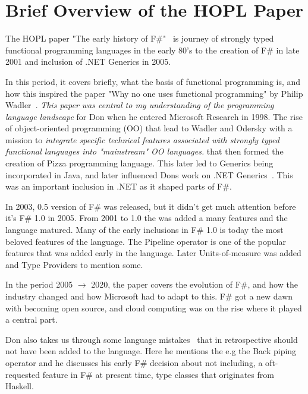 \documentclass[12pt]{article}
\begin{document}
\newpage

\section{Brief Overview of the HOPL Paper}

The HOPL paper "The early history of F\#"~\cite{syme_early_2020} is journey of strongly typed functional programming languages in the early 80's to the creation of F\# in late 2001 and inclusion of .NET Generics in 2005. 

In this period, it covers briefly, what the basis of functional programming is, and how this inspired the paper "Why no one uses functional programming" by Philip Wadler~\cite{wadler_why_1998}. \textit{This paper was central to my understanding of the programming language landscape}\parencite[p 9]{syme_early_2020} for Don when he entered Microsoft Research in 1998. The rise of object-oriented programming (OO) that lead to Wadler and Odersky with a mission to \textit{integrate specific technical features associated with strongly typed functional languages into "mainstream" OO languages.}\parencite[p9]{syme_early_2020} that then formed the creation of Pizza programming language. This later led to Generics being incorporated in Java, and later influenced Dons work on .NET Generics~\cite{syme_ilx_2001}. This was an important inclusion in .NET as it shaped parts of F\#. 

In 2003, 0.5 version of F\# was released, but it didn't get much attention before it's F\# 1.0 in 2005. From 2001 to 1.0 the was added a many features and the language matured.
Many of the early inclusions in F\# 1.0 is today the most beloved features of the language. The Pipeline operator is one of the popular features that was added early in the language. Later Units-of-measure was added and Type Providers to mention some.

In the period 2005 $\rightarrow$ 2020, 
the paper covers the evolution of F\#, and how the industry changed and how Microsoft had to adapt to this. F\# got a new dawn with becoming open source, and cloud computing was on the rise where it played a central part.

Don also takes us through some language mistakes~\cite[p 51]{syme_early_2020} that in retrospective should not have been added to the language. Here he mentions the e.g the Back piping operator and he discusses his early F\# decision about not including, a oft-requested feature in F\# at present time, type classes that originates from Haskell.
\end{document}

